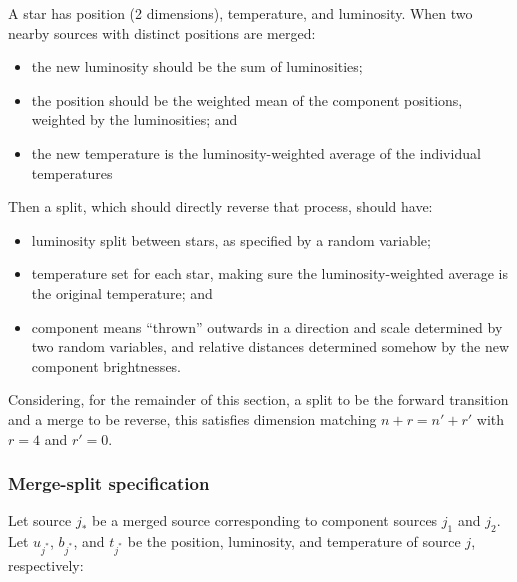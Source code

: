 \documentclass[11pt]{article}
\begin{document}
A star has position (2 dimensions), temperature, and luminosity.
When two nearby sources with distinct positions are merged:
\begin{itemize}
\item the new luminosity should be the sum of luminosities;
\item the position should be the weighted mean of the component positions,
weighted by the luminosities; and
\item the new temperature is the luminosity-weighted average of the
individual temperatures
\end{itemize}
Then a split, which should directly reverse that process, should have:
\begin{itemize}
\item luminosity split between stars, as specified by a random variable;
\item temperature set for each star, making sure the luminosity-weighted average
is the original temperature; and
\item component means {}``thrown'' outwards in a direction and scale determined
by two random variables, and relative distances determined somehow
by the new component brightnesses.
\end{itemize}
Considering, for the remainder of this section, a split to be the
forward transition and a merge to be reverse, this satisfies dimension
matching $n+r=n'+r'$ with $r=4$ and $r'=0$.


\subsubsection{Merge-split specification\label{sub:merge-split-specification}}

Let source $j_{*}$ be a merged source corresponding to component
sources $j_{1}$ and $j_{2}$. Let $u_{j^*}$, $b_{j^*}$, and $t_{j^*}$
be the position, luminosity, and temperature of source $j$,
respectively:
\end{document}
